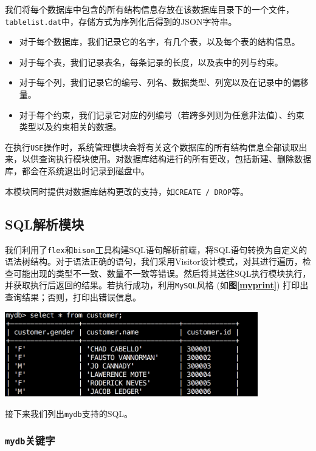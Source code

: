 \documentclass[11pt, a4paper]{article}
\makeatletter
\newcommand\fcaption{\def\@captype{figure}\caption}
\newcommand{\fref}[1]{\textbf{图\ref{#1}}}
\makeatother
\begin{document}
我们将每个数据库中包含的所有结构信息存放在该数据库目录下的一个文件，\texttt{tablelist.dat}中，存储方式为序列化后得到的JSON字符串。

\begin{itemize}
\item 对于每个数据库，我们记录它的名字，有几个表，以及每个表的结构信息。
\item 对于每个表，我们记录表名，每条记录的长度，以及表中的列与约束。
\item 对于每个列，我们记录它的编号、列名、数据类型、列宽以及在记录中的偏移量。
\item 对于每个约束，我们记录它对应的列编号（若跨多列则为任意非法值）、约束类型以及约束相关的数据。
\end{itemize}

在执行\texttt{USE}操作时，系统管理模块会将有关这个数据库的所有结构信息全部读取出来，以供查询执行模块使用。对数据库结构进行的所有更改，包括新建、删除数据库，都会在系统退出时记录到磁盘中。

本模块同时提供对数据库结构更改的支持，如\texttt{CREATE / DROP}等。

\subsection{SQL解析模块}

我们利用了\texttt{flex}和\texttt{bison}工具构建SQL语句解析前端，将SQL语句转换为自定义的语法树结构。对于语法正确的语句，我们采用Visitor设计模式，对其进行遍历，检查可能出现的类型不一致、数量不一致等错误。然后将其送往SQL执行模块执行，并获取执行后返回的结果。若执行成功，利用\texttt{MySQL}风格 (如\fref{myprint}) 打印出查询结果；否则，打印出错误信息。

\begin{center}
    \includegraphics[width=11cm]{fig/mysql}
    \fcaption{\texttt{MySQL}风格打印}\label{myprint}
\end{center}

接下来我们列出\texttt{mydb}支持的SQL。

\subsubsection{\texttt{mydb}关键字}
\end{document}
